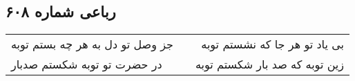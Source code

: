 \begin{center}
\section*{رباعی شماره ۶۰۸}
\label{sec:sh608}
\begin{longtable}{l p{0.5cm} r}
جز وصل تو دل به هر چه بستم توبه
&&
بی یاد تو هر جا که نشستم توبه
\\
در حضرت تو توبه شکستم صدبار
&&
زین توبه که صد بار شکستم توبه
\\
\end{longtable}
\end{center}
